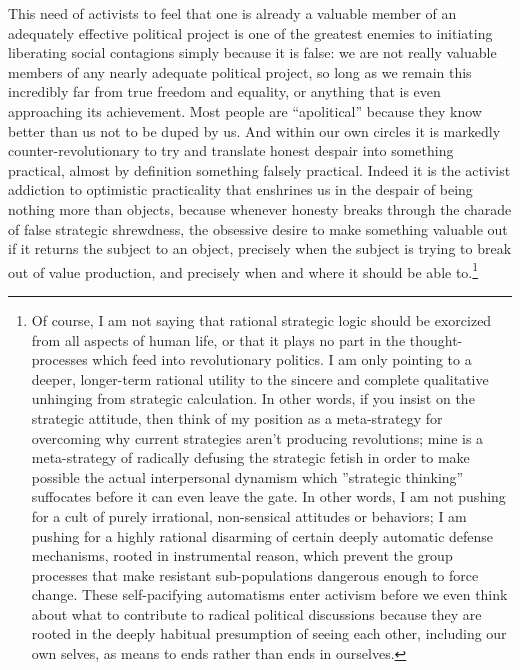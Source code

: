 \documentclass[a4paper,12pt,margin=.5in]{article}
\begin{document}
This need of activists to feel that one is already a valuable member of
an adequately effective political project is one of the greatest enemies
to initiating liberating social contagions simply because it is false:
we are not really valuable members of any nearly adequate political
project, so long as we remain this incredibly far from true freedom and
equality, or anything that is even approaching its achievement. Most
people are ``apolitical'' because they know better than us not to be
duped by us. And within our own circles it is markedly
counter-revolutionary to try and translate honest despair into something
practical, almost by definition something falsely practical. Indeed it
is the activist addiction to optimistic practicality that enshrines us
in the despair of being nothing more than objects, because whenever
honesty breaks through the charade of false strategic shrewdness, the
obsessive desire to make something valuable out if it returns the
subject to an object, precisely when the subject is trying to break out
of value production, and precisely when and where it should be able
to.\footnote{Of course, I am not saying that rational strategic logic
  should be exorcized from all aspects of human life, or that it plays
  no part in the thought-processes which feed into revolutionary
  politics. I am only pointing to a deeper, longer-term rational utility
  to the sincere and complete qualitative unhinging from strategic
  calculation. In other words, if you insist on the strategic attitude,
  then think of my position as a meta-strategy for overcoming why
  current strategies aren't producing revolutions; mine is a
  meta-strategy of radically defusing the strategic fetish in order to
  make possible the actual interpersonal dynamism which ''strategic
  thinking'' suffocates before it can even leave the gate. In other
  words, I am not pushing for a cult of purely irrational, non-sensical
  attitudes or behaviors; I am pushing for a highly rational disarming
  of certain deeply automatic defense mechanisms, rooted in instrumental
  reason, which prevent the group processes that make resistant
  sub-populations dangerous enough to force change. These self-pacifying
  automatisms enter activism before we even think about what to
  contribute to radical political discussions because they are rooted in
  the deeply habitual presumption of seeing each other, including our
  own selves, as means to ends rather than ends in ourselves.}
\end{document}
